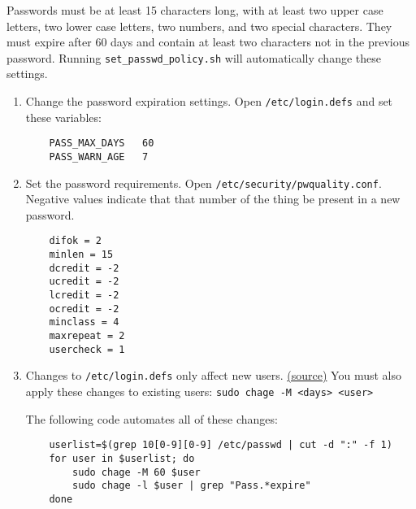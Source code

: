 Passwords must be at least 15 characters long, with at least two upper case letters, two lower case letters, two numbers, and two special characters. They must expire after 60 days and contain at least two characters not in the previous password. Running \texttt{set\_passwd\_policy.sh} will automatically change these settings.

\begin{enumerate}
\item Change the password expiration settings. Open \texttt{/etc/login.defs} and set these variables:

	\begin{verbatim}
	PASS_MAX_DAYS   60
	PASS_WARN_AGE   7
	\end{verbatim}

\item Set the password requirements. Open \texttt{/etc/security/pwquality.conf}. Negative values indicate that that number of the thing be present in a new password.

	\begin{verbatim}
	difok = 2
	minlen = 15
	dcredit = -2
	ucredit = -2
	lcredit = -2
	ocredit = -2
	minclass = 4
	maxrepeat = 2
	usercheck = 1
	\end{verbatim}

\item Changes to \texttt{/etc/login.defs} only affect new users. \href{https://www.server-world.info/en/note?os=Ubuntu_16.04&p=password}{(source)} You must also apply these changes to existing users: \texttt{sudo chage -M <days> <user>}

	The following code automates all of these changes:

	\begin{verbatim}
	userlist=$(grep 10[0-9][0-9] /etc/passwd | cut -d ":" -f 1)
	for user in $userlist; do
	    sudo chage -M 60 $user
	    sudo chage -l $user | grep "Pass.*expire"
	done
	\end{verbatim}

\end{enumerate}
